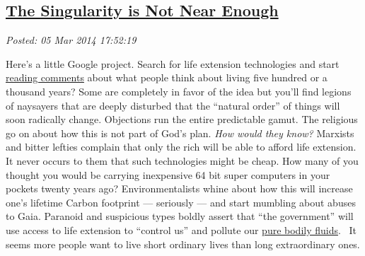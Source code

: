 %

\subsection*{\href{http://bakerjd99.wordpress.com/2014/03/05/the-singularity-is-not-near-enough/}{The Singularity is Not Near Enough}}


\noindent\emph{Posted: 05 Mar 2014 17:52:19}
\vspace{6pt}

Here's a little Google project. Search for life extension technologies
and start
\href{http://www.dailymail.co.uk/sciencetech/article-2523086/Could-humans-live-500-years-old-Scientists-believe-genetic-tweaks-significantly-extend-lifespan.html}{reading
comments} about what people think about living five hundred or a
thousand years? Some are completely in favor of the idea but you'll find
legions of naysayers that are deeply disturbed that the ``natural
order'' of things will soon radically change. Objections run the entire
predictable gamut. The religious go on about how this is not part of
God's plan. \emph{How would they know?} Marxists and bitter lefties
complain that only the rich will be able to afford life extension. It
never occurs to them that such technologies might be cheap. How many of
you thought you would be carrying inexpensive 64 bit super computers in
your pockets twenty years ago? Environmentalists whine about how this
will increase one's lifetime Carbon footprint --- seriously --- and
start mumbling about abuses to Gaia. Paranoid and suspicious types
boldly assert that ``the government'' will use access to life extension
to ``control us'' and pollute our
\href{http://www.youtube.com/watch?v=N1KvgtEnABY}{pure bodily fluids}.~
It seems more people want to live short ordinary lives than long
extraordinary ones.


